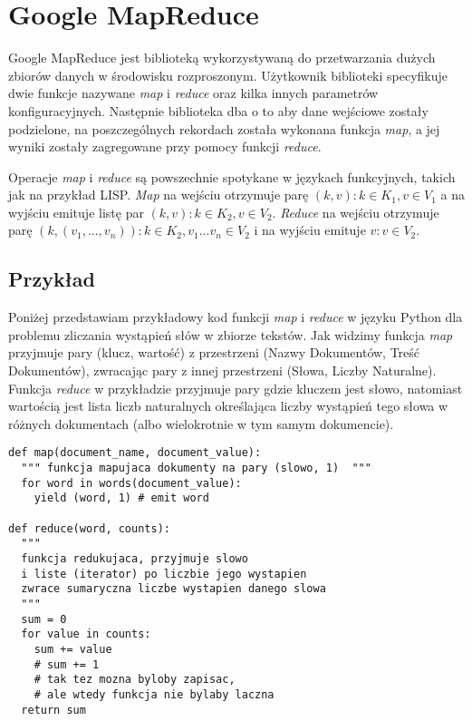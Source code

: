 \section{Google MapReduce}

Google MapReduce \cite{google-mapreduce} jest biblioteką wykorzystywaną do przetwarzania dużych zbiorów danych w środowisku rozproszonym.
Użytkownik biblioteki specyfikuje dwie funkcje nazywane \emph{map} i \emph{reduce} oraz kilka innych parametrów konfiguracyjnych.
Następnie biblioteka dba o to aby dane wejściowe zostały podzielone, na poszczególnych rekordach została wykonana funkcja \emph{map}, a jej wyniki zostały zagregowane przy pomocy funkcji \emph{reduce}.

Operacje \emph{map} i \emph{reduce} są powszechnie spotykane w językach funkcyjnych, takich jak na przykład LISP.
\emph{Map} na wejściu otrzymuje parę $(k, v): k \in K_1, v \in V_1$ a na wyjściu emituje listę par $(k, v): k \in K_2, v \in V_2$.
\emph{Reduce} na wejściu otrzymuje parę $(k, (v_1, ..., v_n)): k \in K_2, v_1...v_n \in V_2$ i na wyjściu emituje $v: v \in V_2$.

\subsection*{Przykład}

Poniżej przedstawiam przykładowy kod funkcji \emph{map} i \emph{reduce} w języku Python dla problemu zliczania wystąpień słów w zbiorze tekstów. 
Jak widzimy funkcja \emph{map} przyjmuje pary (klucz, wartość) z przestrzeni (Nazwy Dokumentów, Treść Dokumentów), zwracając pary z innej przestrzeni (Słowa, Liczby Naturalne).
Funkcja \emph{reduce} w przykładzie przyjmuje pary gdzie kluczem jest słowo, natomiast wartością jest lista liczb naturalnych określająca liczby wystąpień tego słowa w różnych dokumentach (albo wielokrotnie w tym samym dokumencie).

\begin{verbatim}
def map(document_name, document_value):
  """ funkcja mapujaca dokumenty na pary (slowo, 1)  """
  for word in words(document_value):
    yield (word, 1) # emit word

def reduce(word, counts):
  """ 
  funkcja redukujaca, przyjmuje slowo 
  i liste (iterator) po liczbie jego wystapien
  zwrace sumaryczna liczbe wystapien danego slowa
  """
  sum = 0
  for value in counts:
    sum += value
    # sum += 1
    # tak tez mozna byloby zapisac, 
    # ale wtedy funkcja nie bylaby laczna     
  return sum 
\end{verbatim}


